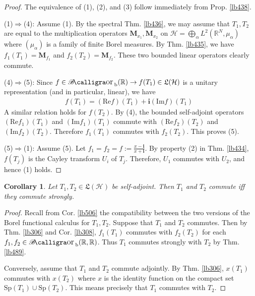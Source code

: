 \documentclass[12pt,b5paper,notitlepage]{article}
\theoremstyle{definition}
\theoremstyle{plain}
\newtheorem{co}[df]{Corollary}
\DeclareMathOperator{\Borb}{{\mathscr{B}\text{\kern -2pt {\calligra\large or}}\,}_{\mathrm b}}
\newcommand{\fk}{\mathfrak}
\newcommand{\im}{\mathbf{i}}
\newcommand{\Rbb}{\mathbb R}
\newcommand{\Sp}{\mathrm{Sp}}
\newcommand{\Real}{\mathrm{Re}}
\newcommand{\Imag}{\mathrm{Im}}
\newcommand{\MH}{\mathcal H}
\newcommand{\Mbf}{\mathbf M}
\numberwithin{equation}{section}
\begin{document}
\begin{proof}
The equivalence of (1), (2), and (3) follow immediately from Prop. \ref{lb438}. 


(1)$\Rightarrow$(4): Assume (1). By the spectral Thm. \ref{lb436}, we may assume that $T_1,T_2$ are equal to the multiplication operators $\Mbf_{x_1},\Mbf_{x_2}$ on $\MH=\bigoplus_\alpha L^2(\Rbb^N,\mu_\alpha)$ where $(\mu_\alpha)$ is a family of finite Borel measures. By Thm. \ref{lb435}, we have $f_1(T_1)=\Mbf_{f_1}$ and $f_2(T_2)=\Mbf_{f_2}$. These two bounded linear operators clearly commute.



(4)$\Rightarrow$(5): Since $f\in\Borb(\Rbb)\rightarrow f(T_1)\in\fk L(\MH)$ is a unitary representation (and in particular, linear), we have
\begin{align*}
f(T_1)=(\Real f)(T_1)+\im(\Imag f)(T_1)
\end{align*}
A similar relation holds for $f(T_2)$. By (4), the bounded self-adjoint operators $(\Real f_1)(T_1)$ and $(\Imag f_1)(T_1)$ commute with $(\Real f_2)(T_2)$ and $(\Imag f_2)(T_2)$. Therefore $f_1(T_1)$ commutes with $f_2(T_2)$. This proves (5). 



(5)$\Rightarrow$(1): Assume (5). Let $f_1=f_2=f:=\frac{x-\im}{x+\im}$. By property (2) in Thm. \ref{lb434}, $f(T_j)$ is the Cayley transform $U_i$ of $T_j$. Therefore, $U_1$ commutes with $U_2$, and hence (1) holds.
\end{proof}


\begin{co}
Let $T_1,T_2\in\fk L(\MH)$ be self-adjoint. Then $T_1$ and $T_2$ commute iff they commute strongly. 
\end{co}

\begin{proof}
Recall from Cor. \ref{lb506} the compatibility between the two versions of the Borel functional calculus for $T_1,T_2$. Suppose that $T_1$ and $T_2$ commutes. Then by Thm. \ref{lb306} and Cor. \ref{lb308}, $f_1(T_1)$ commutes with $f_2(T_2)$ for each $f_1,f_2\in\Borb(\Rbb,\Rbb)$. Thus $T_1$ commutes strongly with $T_2$ by Thm. \ref{lb489}.

Conversely, assume that $T_1$ and $T_2$ commute adjointly. By Thm. \ref{lb306}, $x(T_1)$ commutes with $x(T_2)$ where $x$ is the identity function on the compact set $\Sp(T_1)\cup\Sp(T_2)$. This means precisely that $T_1$ commutes with $T_2$.
\end{proof}
\end{document}
